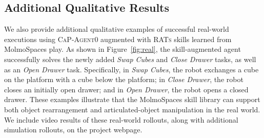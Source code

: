 \subsection{Additional Qualitative Results}
\label{sec:appendix_additional_qualitative}

We also provide additional qualitative examples of successful real-world executions using
\textsc{CaP-Agent0} augmented with \textsc{RATs} skills learned from MolmoSpaces play. As shown
in Figure~\ref{fig:real}, the skill-augmented agent successfully solves
the newly added \textit{Swap Cubes} and \textit{Close Drawer} tasks, as well as an \textit{Open Drawer}
task. Specifically, in \textit{Swap Cubes}, the robot exchanges a cube on the platform with a cube 
below the platform; in \textit{Close Drawer}, the robot closes an initially open drawer; and in 
\textit{Open Drawer}, the robot opens a closed drawer. These examples illustrate that the MolmoSpaces 
skill library can support both object rearrangement and articulated-object manipulation in the real world. 
We include video results of these real-world rollouts, along with additional simulation rollouts, 
on the project webpage.




